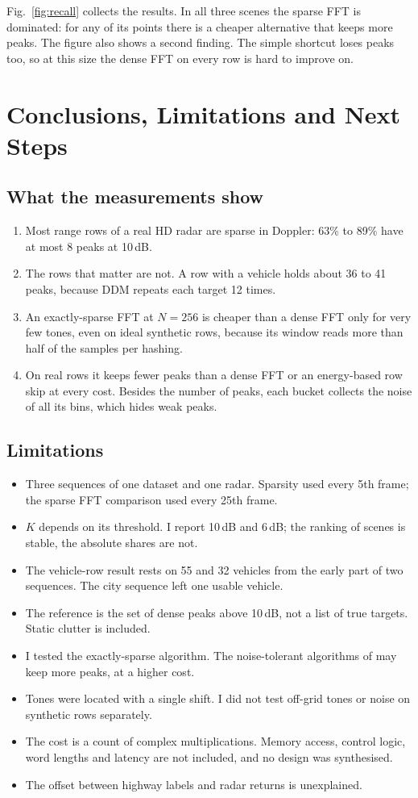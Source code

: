 \documentclass[10pt,a4paper]{article}
\begin{document}
Fig.~\ref{fig:recall} collects the results. In all three scenes the sparse FFT is dominated: for any of its points there is a cheaper alternative that keeps more peaks. The figure also shows a second finding. The simple shortcut loses peaks too, so at this size the dense FFT on every row is hard to improve on.

\section{Conclusions, Limitations and Next Steps}
\subsection{What the measurements show}
\begin{enumerate}
\item Most range rows of a real HD radar are sparse in Doppler: 63\% to 89\% have at most 8 peaks at 10\,dB.
\item The rows that matter are not. A row with a vehicle holds about 36 to 41 peaks, because DDM repeats each target 12 times.
\item An exactly-sparse FFT at $N = 256$ is cheaper than a dense FFT only for very few tones, even on ideal synthetic rows, because its window reads more than half of the samples per hashing.
\item On real rows it keeps fewer peaks than a dense FFT or an energy-based row skip at every cost. Besides the number of peaks, each bucket collects the noise of all its bins, which hides weak peaks.
\end{enumerate}

\subsection{Limitations}
\begin{itemize}
\item Three sequences of one dataset and one radar. Sparsity used every 5th frame; the sparse FFT comparison used every 25th frame.
\item $K$ depends on its threshold. I report 10\,dB and 6\,dB; the ranking of scenes is stable, the absolute shares are not.
\item The vehicle-row result rests on 55 and 32 vehicles from the early part of two sequences. The city sequence left one usable vehicle.
\item The reference is the set of dense peaks above 10\,dB, not a list of true targets. Static clutter is included.
\item I tested the exactly-sparse algorithm. The noise-tolerant algorithms of \cite{hassanieh2012nearly,hassanieh2012simple} may keep more peaks, at a higher cost.
\item Tones were located with a single shift. I did not test off-grid tones or noise on synthetic rows separately.
\item The cost is a count of complex multiplications. Memory access, control logic, word lengths and latency are not included, and no design was synthesised.
\item The offset between highway labels and radar returns is unexplained.
\end{itemize}
\end{document}
